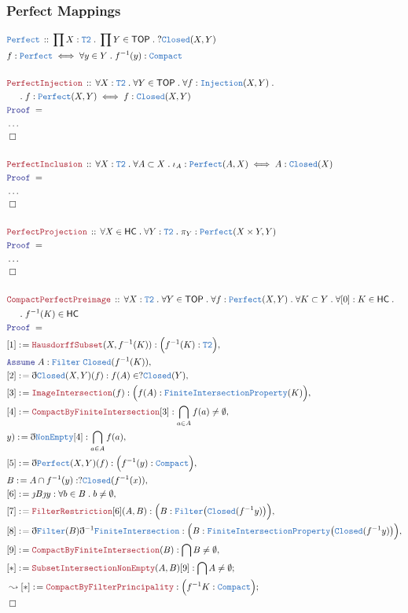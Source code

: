 \documentclass[12pt]{scrartcl}
\newcommand{\TYPE}[1]{\textcolor{NavyBlue}{\mathtt{#1}}}
\newcommand{\LOGIC}[1]{\textcolor{Blue}{\mathtt{#1}}}
\newcommand{\THM}[1]{\textcolor{Maroon}{\mathtt{#1}}}
\renewcommand{\.}{\; . \;}
\newcommand{\de}{: \kern 0.1pc =}
\newcommand{\Theorem}[2]{& \THM{#1} \, :: \, #2 \\ & \Proof = \\ }
\newcommand{\DeclareType}[2]{& \TYPE{#1} \, :: \, #2 \\}
\newcommand{\DefineType}[3]{& #1 : \TYPE{#2} \iff #3 \\}
\newcommand{\NewLine}{\\ & \kern 1pc}
\newcommand{\Page}[1]{ \begin{align*} #1 \end{align*}   }
\newcommand{ \bd }{ \ByDef }
\newcommand{\NoProof}{ & \ldots \\ \EndProof}
\newcommand{\Say}[3]{& #1 \de #2 : #3, \\}
\newcommand{\Conclude}[3]{& #1 \de #2 : #3; \\}
\newcommand{\DeriveConclude}[3]{& \leadsto #1 \de #2 : #3 ; \\}
\newcommand{\Assume}[2]{& \LOGIC{Assume} \; #1 : #2, \\}
\newcommand{\QED}{\; \square}
\newcommand{\EndProof}{& \QED \\}
\newcommand{\ByDef}{\eth}
\newcommand{\ByConstr}{\jmath}
\newcommand{\Proof}{\LOGIC{Proof} \; }
\newcommand{\TOP}{\mathsf{TOP}}
\newcommand{\HC}{\mathsf{HC}}
\begin{document}
\subsubsection{Perfect Mappings}
\Page{
	\DeclareType{Perfect}{\prod X : \TYPE{T2} \. \prod Y \in \TOP \. ?\TYPE{Closed}(X,Y) }
	\DefineType{f}{Perfect}{\forall y \in Y \. f^{-1}(y) : \TYPE{Compact}}
	\\
	\Theorem{PerfectInjection}
	{
		\forall X : \TYPE{T2} \. 
		\forall Y \in \TOP \.
		\forall f :  \TYPE{Injection}(X,Y) \. \NewLine \.
		f :\TYPE{Perfect}(X,Y) \iff f : \TYPE{Closed}(X,Y)				 
	}
	\NoProof
	\\
	\Theorem{PerfectInclusion}
	{
		\forall X : \TYPE{T2} \. 
		\forall A \subset  X \.
		\iota_{A} :\TYPE{Perfect}(A,X) \iff  A : \TYPE{Closed}(X)				 
	}
	\NoProof
	\\
	\Theorem{PerfectProjection}
	{
		\forall X \in \HC \.
		\forall Y : \TYPE{T2} \. 
		\pi_Y : \TYPE{Perfect}(X \times Y, Y )
	}
	\NoProof
	\\
	\Theorem{ CompactPerfectPreimage }
	{
		\forall X : \TYPE{T2} \.
		\forall Y \in \TOP \.
		\forall f  : \TYPE{Perfect}(X,Y) \.
		\forall K \subset Y \.
		\forall [0] : K \in \HC \.
		\NewLine \.
		f^{-1}(K) \in \HC
	}
	\Say{[1]}{\THM{HausdorffSubset}(X,f^{-1}(K))}{\Big(  f^{-1}(K) : \TYPE{T2} \Big)}
	\Assume{A}{\TYPE{Filter}\;\TYPE{Closed}(f^{-1}(K))}
	\Say{[2]}{\bd \TYPE{Closed}(X,Y)(f)}{f(A) \in ?\TYPE{Closed}(Y)}
	\Say{[3]}{\THM{ImageIntersection}(f)}{\Big( f(A) : \TYPE{FiniteIntersectionProperty}(K)  \Big)}
	\Say{[4]}{\THM{CompactByFiniteIntersection}[3]}{\bigcap_{a \in A} f(a) \neq \emptyset}
	\Say{y)}{\bd\TYPE{NonEmpty}[4]}{\bigcap_{a \in A} f(a)}
	\Say{[5]}{\bd \TYPE{Perfect}(X,Y)(f)}{ \Big( f^{-1}(y) : \TYPE{Compact}\Big) }
	\Say{B}{ A \cap f^{-1}(y)}{?\TYPE{Closed}(f^{-1}(x))}
	\Say{[6]}{\ByConstr B\ByConstr y}{\forall b \in B \. b \neq \emptyset}
	\Say{[7]}{\THM{FilterRestriction}[6](A,B)}{\Big(B : \TYPE{Filter}\big(\TYPE{Closed}(f^{-1}y)\big)\Big) }
	\Say{[8]}{\bd \TYPE{Filter}(B)\bd^{-1}\TYPE{FiniteIntersection}}{\Big(B : \TYPE{FiniteIntersectionProperty}\big(\TYPE{Closed}(f^{-1}y)\big)\Big)}
	\Say{[9]}{\THM{CompactByFiniteIntersection}(B)}{ \bigcap B \neq \emptyset   }
	\Conclude{[*]}{\THM{SubsetIntersectionNonEmpty}(A,B)[9]}{\bigcap A \neq \emptyset}
	\DeriveConclude{[*]}{\THM{CompactByFilterPrincipality}}{\Big( f^{-1}K : \TYPE{Compact}\Big)}
	\EndProof
}
\end{document}
